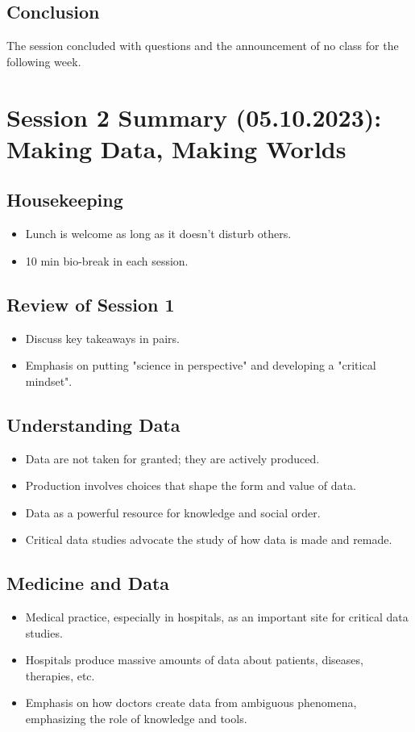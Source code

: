\documentclass{article}
\begin{document}
\subsection*{Conclusion}
The session concluded with questions and the announcement of no class for the following week.

\section*{Session 2 Summary (05.10.2023): Making Data, Making Worlds}

\subsection*{Housekeeping}
\begin{itemize}
    \item Lunch is welcome as long as it doesn't disturb others.
    \item 10 min bio-break in each session.
\end{itemize}

\subsection*{Review of Session 1}
\begin{itemize}
    \item Discuss key takeaways in pairs.
    \item Emphasis on putting "science in perspective" and developing a "critical mindset".
\end{itemize}

\subsection*{Understanding Data}
\begin{itemize}
    \item Data are not taken for granted; they are actively produced.
    \item Production involves choices that shape the form and value of data.
    \item Data as a powerful resource for knowledge and social order.
    \item Critical data studies advocate the study of how data is made and remade.
\end{itemize}

\subsection*{Medicine and Data}
\begin{itemize}
    \item Medical practice, especially in hospitals, as an important site for critical data studies.
    \item Hospitals produce massive amounts of data about patients, diseases, therapies, etc.
    \item Emphasis on how doctors create data from ambiguous phenomena, emphasizing the role of knowledge and tools.
\end{itemize}
\end{document}
